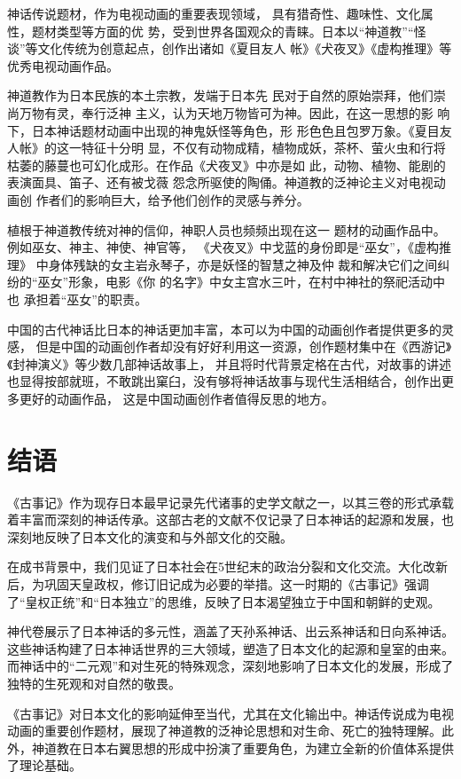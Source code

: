 \documentclass{ctexart}
\begin{document}
神话传说题材，作为电视动画的重要表现领域，
具有猎奇性、趣味性、文化属性，题材类型等方面的优
势，受到世界各国观众的青睐。日本以“神道教”“怪
谈”等文化传统为创意起点，创作出诸如《夏目友人
帐》《犬夜叉》《虚构推理》等优秀电视动画作品。


神道教作为日本民族的本土宗教，发端于日本先
民对于自然的原始崇拜，他们崇尚万物有灵，奉行泛神
主义，认为天地万物皆可为神。因此，在这一思想的影
响下，日本神话题材动画中出现的神鬼妖怪等角色，形
形色色且包罗万象。《夏目友人帐》的这一特征十分明
显，不仅有动物成精，植物成妖，茶杯、萤火虫和行将
枯萎的藤蔓也可幻化成形。在作品《犬夜叉》中亦是如
此，动物、植物、能剧的表演面具、笛子、还有被戈薇
怨念所驱使的陶俑。神道教的泛神论主义对电视动画创
作者们的影响巨大，给予他们创作的灵感与养分。

植根于神道教传统对神的信仰，神职人员也频频出现在这一
题材的动画作品中。例如巫女、神主、神使、神官等，
《犬夜叉》中戈蓝的身份即是“巫女”，《虚构推理》
中身体残缺的女主岩永琴子，亦是妖怪的智慧之神及仲
裁和解决它们之间纠纷的“巫女”形象，电影《你
的名字》中女主宫水三叶，在村中神社的祭祀活动中也
承担着“巫女”的职责。

中国的古代神话比日本的神话更加丰富，本可以为中国的动画创作者提供更多的灵感，
但是中国的动画创作者却没有好好利用这一资源，创作题材集中在《西游记》《封神演义》等少数几部神话故事上，
并且将时代背景定格在古代，对故事的讲述也显得按部就班，不敢跳出窠臼，没有够将神话故事与现代生活相结合，创作出更多更好的动画作品，
这是中国动画创作者值得反思的地方。

\section{结语}

《古事记》作为现存日本最早记录先代诸事的史学文献之一，以其三卷的形式承载着丰富而深刻的神话传承。这部古老的文献不仅记录了日本神话的起源和发展，也深刻地反映了日本文化的演变和与外部文化的交融。

在成书背景中，我们见证了日本社会在5世纪末的政治分裂和文化交流。大化改新后，为巩固天皇政权，修订旧记成为必要的举措。这一时期的《古事记》强调了“皇权正统”和“日本独立”的思维，反映了日本渴望独立于中国和朝鲜的史观。

神代卷展示了日本神话的多元性，涵盖了天孙系神话、出云系神话和日向系神话。这些神话构建了日本神话世界的三大领域，塑造了日本文化的起源和皇室的由来。而神话中的“二元观”和对生死的特殊观念，深刻地影响了日本文化的发展，形成了独特的生死观和对自然的敬畏。

《古事记》对日本文化的影响延伸至当代，尤其在文化输出中。神话传说成为电视动画的重要创作题材，展现了神道教的泛神论思想和对生命、死亡的独特理解。此外，神道教在日本右翼思想的形成中扮演了重要角色，为建立全新的价值体系提供了理论基础。
\end{document}
